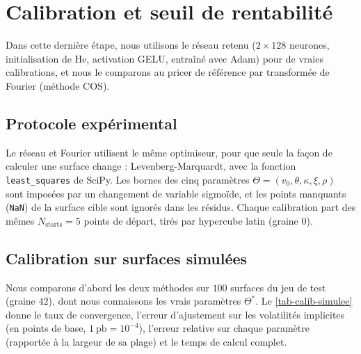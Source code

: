 
\section{Calibration et seuil de rentabilité}
\label{sec-calibration}

Dans cette dernière étape, nous utilisons le réseau retenu ($2 \times 128$ neurones, initialisation de He,
activation GELU, entraîné avec Adam) pour de vraies calibrations, et nous le comparons au pricer de référence par
transformée de Fourier (méthode COS).

\subsection{Protocole expérimental}

Le réseau et Fourier utilisent le même optimiseur, pour que seule la façon de calculer une surface change :
Levenberg-Marquardt, avec la fonction \texttt{least\_squares} de SciPy. Les bornes des cinq paramètres
$\Theta = (v_0, \theta, \kappa, \xi, \rho)$ sont imposées par un changement de variable sigmoïde, et les points
manquants (\texttt{NaN}) de la surface cible sont ignorés dans les résidus. Chaque calibration part des mêmes
$N_{\text{starts}} = 5$ points de départ, tirés par hypercube latin (graine $0$).

\subsection{Calibration sur surfaces simulées}

Nous comparons d'abord les deux méthodes sur $100$ surfaces du jeu de test (graine $42$), dont nous connaissons les
vrais paramètres $\Theta^*$. Le \cref{tab-calib-simulee} donne le taux de convergence, l'erreur d'ajustement sur les
volatilités implicites (en points de base, $1~\text{pb} = 10^{-4}$), l'erreur relative sur chaque paramètre
(rapportée à la largeur de sa plage) et le temps de calcul complet.

